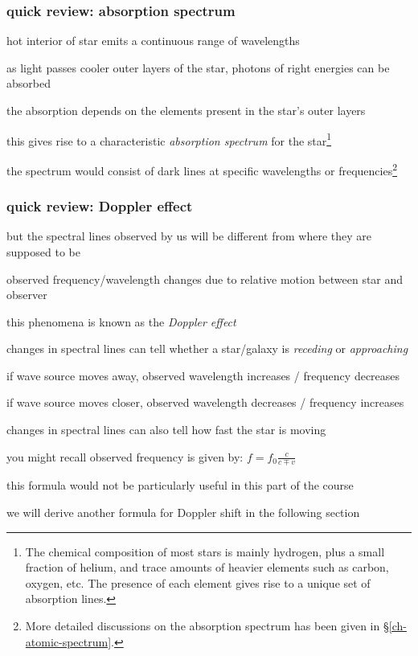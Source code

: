 \subsubsection{quick review: absorption spectrum} 

hot interior of star emits a continuous range of wavelengths

as light passes cooler outer layers of the star, photons of right energies can be absorbed

the absorption depends on the elements present in the star's outer layers

this gives rise to a characteristic \emph{absorption spectrum} for the star\footnote{The chemical composition of most stars is mainly hydrogen, plus a small fraction of helium, and trace amounts of heavier elements such as carbon, oxygen, etc. The presence of each element gives rise to a unique set of absorption lines.}

the spectrum would consist of dark lines at specific wavelengths or frequencies\footnote{More detailed discussions on the absorption spectrum has been given in \S\ref{ch-atomic-spectrum}.}

\subsubsection{quick review: Doppler effect} 

but the spectral lines observed by us will be different from where they are supposed to be

observed frequency/wavelength changes due to relative motion between star and observer

this phenomena is known as the \emph{Doppler effect}

\cmt changes in spectral lines can tell whether a star/galaxy is \emph{receding} or \emph{approaching}

\titem if wave source moves away, observed wavelength increases / frequency decreases

\titem if wave source moves closer, observed wavelength decreases / frequency increases

\cmt changes in spectral lines can also tell how fast the star is moving

you might recall observed frequency is given by: $f = f_0 \frac{c}{c \mp v}$

this formula would not be particularly useful in this part of the course

we will derive another formula for Doppler shift in the following section

